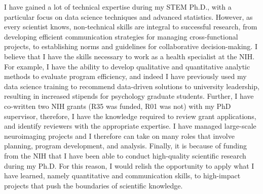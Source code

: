 \documentclass[9pt, a4paper]{maedbh-cv}
\begin{document}
\begin{cvletter}
I have gained a lot of technical expertise during my STEM Ph.D., with a particular focus on data science techniques and advanced statistics. However, as every scientist knows, non-technical skills are integral to successful research, from developing efficient communication strategies for managing cross-functional projects, to establishing norms and guidelines for collaborative decision-making. I believe that I have the skills necessary to work as a health specialist at the NIH. For example, I have the ability to develop qualitative and quantitative analytic methods to evaluate program efficiency, and indeed I have previously used my data science training to recommend data-driven solutions to university leadership, resulting in increased stipends for psychology graduate students. Further, I have co-written two NIH grants (R35 was funded, R01 was not) with my PhD supervisor, therefore, I have the knowledge required to review grant applications, and identify reviewers with the appropriate expertise. I have managed large-scale neuroimaging projects and I therefore can take on many roles that involve planning, program development, and analysis. Finally, it is because of funding from the NIH that I have been able to conduct high-quality scientific research during my Ph.D. For this reason, I would relish the opportunity to apply what I have learned, namely quantitative and communication skills, to high-impact projects that push the boundaries of scientific knowledge. 

\end{cvletter}

\makeletterclosing
\end{document}
